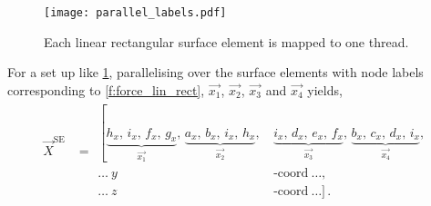\begin{figure}
    \centering
    \texttt{[image: parallel\_labels.pdf]}
    \caption[Linear rectangular surface element mapping.]{Each linear rectangular surface element is mapped to one thread.}
    \label{f:paraLabel}
\end{figure}
For a set up like \cref{f:paraLabel}, parallelising over the surface elements with node labels corresponding to \cref{f:force_lin_rect}, $\vec{x_1}$, $\vec{x_2}$, $\vec{x_3}$ and $\vec{x_4}$ yields,
\begin{align}\label{eq:fcne_eg}
    \vec{X}^{\textrm{SE}} & = \begin{aligned}
        \left[\underbrace{h_{x},\, i_{x},\, f_{x},\, g_{x}}_{\vec{x_{1}}},\,
        \underbrace{a_{x},\, b_{x},\, i_{x},\, h_{x}}_{\vec{x_{2}}},\,
        \right.  & \underbrace{i_{x},\, d_{x},\, e_{x},\, f_{x}}_{\vec{x_{3}}},\,
        \underbrace{b_{x},\, c_{x},\, d_{x},\, i_{x}}_{\vec{x_{4}}},              \\
        \ldots~y & \textrm{-coord}~\ldots,                                        \\
        \ldots~z & \textrm{-coord}~\ldots]\,.
    \end{aligned}
\end{align}

